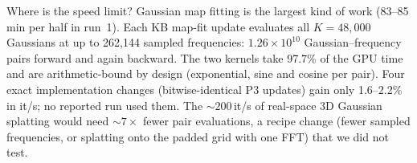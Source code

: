 Where is the speed limit? Gaussian map fitting is the largest kind of work (83--85\,min per half in run~1).
Each KB map-fit update evaluates all $K=48{,}000$ Gaussians at up to 262{,}144 sampled frequencies: $1.26\times10^{10}$ Gaussian--frequency pairs forward and again backward.
The two kernels take 97.7\% of the GPU time and are arithmetic-bound by design (exponential, sine and cosine per pair).
Four exact implementation changes (bitwise-identical P3 updates) gain only 1.6--2.2\% in it/s; no reported run used them.
The ${\sim}200$\,it/s of real-space 3D Gaussian splatting would need ${\sim}7\times$ fewer pair evaluations, a recipe change (fewer sampled frequencies, or splatting onto the padded grid with one FFT) that we did not test.


